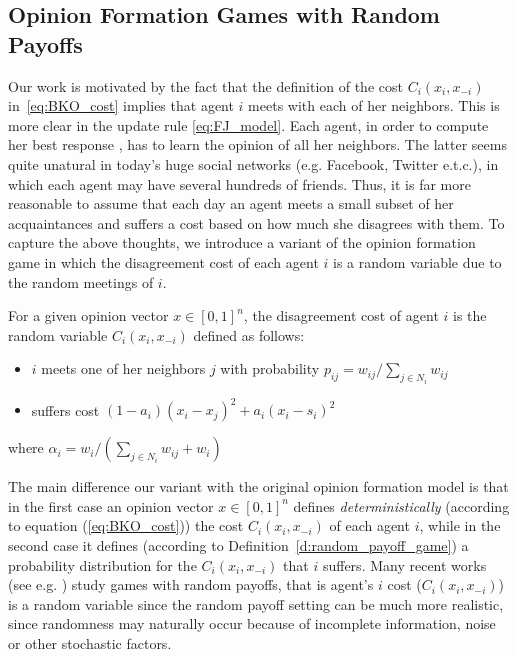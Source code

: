 \subsection{Opinion Formation Games with Random Payoffs}
Our work is motivated by the fact that the definition of the cost $C_i(x_i,x_{-i})$
in~\ref{eq:BKO_cost} implies that agent $i$ meets with each of her neighbors. This is more
clear in the update rule \ref{eq:FJ_model}. Each agent, in order to compute her best response
, has to learn the opinion of all her neighbors. The latter seems quite unatural in today's
huge social networks (e.g. Facebook, Twitter e.t.c.), in which each agent may have
several hundreds of friends. Thus, it is far more reasonable to assume
that each day an agent meets a small subset of her acquaintances and
suffers a cost based on how much she disagrees with them. To capture the above thoughts,
we introduce a variant of the opinion formation game in which the disagreement cost of each agent 
$i$ is a random variable due to the random meetings of $i$.  

\begin{definition}\label{d:random_payoff_game}
  For a given opinion vector $x \in [0,1]^n$, the disagreement cost of agent $i$
  is the random variable $C_i(x_i,x_{-i})$ defined as follows:
  \begin{itemize}
    \item $i$ meets one of her neighbors $j$ with probability $p_{ij}= w_{ij}/\sum_{j\in N_i}w_{ij}$
    \item suffers cost $(1-a_i)(x_i-x_j)^2 + a_i(x_i-s_i)^2$
  \end{itemize}
  where $\alpha_i = w_i/(\sum_{j\in N_i}w_{ij}+w_i)$
\end{definition}
\noindent The main difference our variant with the original opinion formation model is that 
in the first case an opinion vector $x\in [0,1]^n$ defines \emph{deterministically} (according to 
equation (\ref{eq:BKO_cost})) the cost $C_i(x_i,x_{-i})$ of each agent $i$, while in the second 
case it defines (according to Definition~\ref{d:random_payoff_game})
a probability distribution for the $C_i(x_i,x_{-i})$ that $i$ suffers.
Many recent works (see e.g. \cite{Zhou17,CLL16}) study games
with random payoffs, that is agent's $i$ cost ($C_i(x_i,x_{-i})$) is a
random variable since the random payoff setting can be much more realistic,
since randomness may naturally occur because of incomplete information, noise
or other stochastic factors.


